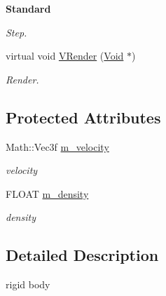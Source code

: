 \begin{Indent}{\bf Standard}
\begin{DoxyCompactItemize}
\begin{DoxyCompactList}\small\item\em Step. \item\end{DoxyCompactList}\item 
\hypertarget{classContent_1_1Actor_1_1Admin_1_1RigidBody_aa7fc4de811680d86ffb18025403745f1}{
virtual void \hyperlink{classContent_1_1Actor_1_1Admin_1_1RigidBody_aa7fc4de811680d86ffb18025403745f1}{VRender} (\hyperlink{structVoid}{Void} $\ast$)}
\label{classContent_1_1Actor_1_1Admin_1_1RigidBody_aa7fc4de811680d86ffb18025403745f1}

\begin{DoxyCompactList}\small\item\em Render. \item\end{DoxyCompactList}\end{DoxyCompactItemize}
\end{Indent}
\subsection*{Protected Attributes}
\begin{DoxyCompactItemize}
\item 
\hypertarget{classContent_1_1Actor_1_1Admin_1_1RigidBody_ada33e7b04db40ce7882525f71a31c349}{
Math::Vec3f \hyperlink{classContent_1_1Actor_1_1Admin_1_1RigidBody_ada33e7b04db40ce7882525f71a31c349}{m\_\-velocity}}
\label{classContent_1_1Actor_1_1Admin_1_1RigidBody_ada33e7b04db40ce7882525f71a31c349}

\begin{DoxyCompactList}\small\item\em velocity \item\end{DoxyCompactList}\item 
\hypertarget{classContent_1_1Actor_1_1Admin_1_1RigidBody_a4de5f07a6ca8c3e135ea35c07b18d4b4}{
FLOAT \hyperlink{classContent_1_1Actor_1_1Admin_1_1RigidBody_a4de5f07a6ca8c3e135ea35c07b18d4b4}{m\_\-density}}
\label{classContent_1_1Actor_1_1Admin_1_1RigidBody_a4de5f07a6ca8c3e135ea35c07b18d4b4}

\begin{DoxyCompactList}\small\item\em density \item\end{DoxyCompactList}\end{DoxyCompactItemize}


\subsection{Detailed Description}
rigid body 

